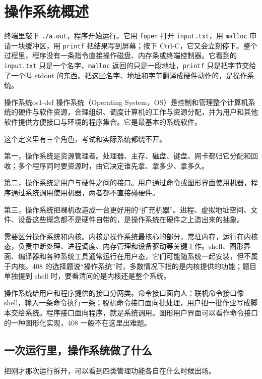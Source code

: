\section{操作系统概述}

终端里敲下 \texttt{./a.out}，程序开始运行。它用 \texttt{fopen} 打开 \texttt{input.txt}，用 \texttt{malloc} 申请一块缓冲区，用 \texttt{printf} 把结果写到屏幕；按下 Ctrl-C，它又会立刻停下。整个过程里，程序没有一条指令直接操作磁盘、内存条或终端控制器。它看到的 \texttt{input.txt} 只是一个名字，\texttt{malloc} 返回的只是一段地址，\texttt{printf} 只是把字节交给了一个叫 stdout 的东西。把这些名字、地址和字节翻译成硬件动作的，是操作系统。

\begin{mydef}{操作系统}{os1-def}
操作系统（Operating System，OS）是控制和管理整个计算机系统的硬件与软件资源，合理组织、调度计算机的工作与资源分配，并为用户和其他软件提供方便接口与环境的程序集合。它是最基本的系统软件。
\end{mydef}

这个定义里有三个角色，考试和实际系统都绕不开。

第一，操作系统是资源管理者。处理器、主存、磁盘、键盘、网卡都归它分配和回收；多个程序同时要资源时，由它决定谁先拿、拿多少、拿多久。

第二，操作系统是用户与硬件之间的接口。用户通过命令或图形界面使用机器，程序通过系统调用使用机器，两者都不直接碰硬件。

第三，操作系统把裸机改造成一台更好用的“扩充机器”。进程、虚拟地址空间、文件、设备这些概念都不是硬件自带的，是操作系统在硬件之上造出来的抽象。

需要区分操作系统和内核。内核是操作系统最核心的部分，常驻内存，运行在内核态，负责中断处理、进程调度、内存管理和设备驱动等关键工作。shell、图形界面、编译器和各种系统工具通常运行在用户态，它们可能随系统一起安装，但不属于内核。408 的选择题说“操作系统”时，多数情况下指的是内核提供的功能；题目单独提到 shell 时，要看清问的是内核还是整个系统。

操作系统给用户和程序提供的接口分两类。命令接口面向人：联机命令接口像 shell，输入一条命令执行一条；脱机命令接口面向批处理，用户把一批作业写成脚本交给系统。程序接口面向程序，就是系统调用。图形用户界面可以看作命令接口的一种图形化实现，408 一般不在这里出难题。

\subsection{一次运行里，操作系统做了什么}

把刚才那次运行拆开，可以看到四类管理功能各自在什么时候出场。

